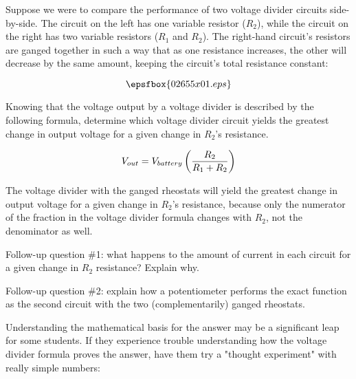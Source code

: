 

Suppose we were to compare the performance of two voltage divider circuits side-by-side.  The circuit on the left has one variable resistor ($R_2$), while the circuit on the right has two variable resistors ($R_1$ and $R_2$).  The right-hand circuit's resistors are ganged together in such a way that as one resistance increases, the other will decrease by the same amount, keeping the circuit's total resistance constant:

$$\epsfbox{02655x01.eps}$$

Knowing that the voltage output by a voltage divider is described by the following formula, determine which voltage divider circuit yields the greatest change in output voltage for a given change in $R_2$'s resistance.

$$V_{out} = V_{battery} \left({R_2 \over {R_1 + R_2}}\right)$$







The voltage divider with the ganged rheostats will yield the greatest change in output voltage for a given change in $R_2$'s resistance, because only the numerator of the fraction in the voltage divider formula changes with $R_2$, not the denominator as well.

\vskip 10pt

Follow-up question \#1: what happens to the amount of current in each circuit for a given change in $R_2$ resistance?  Explain why.

\vskip 10pt

Follow-up question \#2: explain how a potentiometer performs the exact function as the second circuit with the two (complementarily) ganged rheostats.







Understanding the mathematical basis for the answer may be a significant leap for some students.  If they experience trouble understanding how the voltage divider formula proves the answer, have them try a "thought experiment" with really simple numbers:


